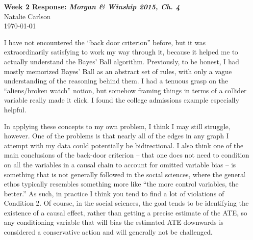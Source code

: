 \documentclass[12pt]{article}
\begin{document}
\begin{center}
  \Large \textbf{Week 2 Response: \textit{Morgan \& Winship 2015, Ch. 4}} \\
  \vspace{0.1in}
  \normalsize Natalie Carlson \\
  \today
\end{center}

I have not encountered the ``back door criterion'' before, but it was extraordinarily satisfying to work my way through it, because it helped me to actually understand the Bayes' Ball algorithm. Previously, to be honest, I had mostly memorized Bayes' Ball as an abstract set of rules, with only a vague understanding of the reasoning behind them. I had a tenuous grasp on the ``aliens/broken watch'' notion, but somehow framing things in terms of a collider variable really made it click. I found the college admissions example especially helpful. 

In applying these concepts to my own problem, I think I may still struggle, however. One of the problems is that nearly all of the edges in any graph I attempt with my data could potentially be bidirectional. I also think one of the main conclusions of the back-door criterion -- that one does not need to condition on all the variables in a causal chain to account for omitted variable bias -- is something that is not generally followed in the social sciences, where the general ethos typically resembles something more like ``the more control variables, the better.'' As such, in practice I think you tend to find a lot of violations of Condition 2. Of course, in the social sciences, the goal tends to be identifying the existence of a causal effect, rather than getting a precise estimate of the ATE, so any conditioning variable that will bias the estimated ATE downwards is considered a conservative action and will generally not be challenged. 
\end{document}
